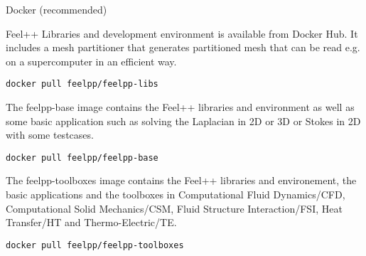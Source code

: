 \begin{frame}{Docker (recommended)}

    \begin{tcolorbox}[title=\texttt{feelpp/feelpp-libs},enhanced, watermark
      graphics=figures/feelpp/download-image-button.jpg, watermark
      overzoom=1.0, height=5cm,watermark opacity=0.25]


      Feel++ Libraries and development environment is available from
      Docker Hub. It includes a mesh partitioner that generates
      partitioned mesh that can be read e.g. on a supercomputer in an
      efficient way.\\[1cm]

      \centerline{\texttt{docker pull feelpp/feelpp-libs}}

    \end{tcolorbox}
    \framebreak
        \begin{tcolorbox}[title=\texttt{feelpp/feelpp-base},enhanced, watermark
      graphics=figures/feelpp/download-image-button.jpg, watermark
      overzoom=1.0, height=5cm,watermark opacity=0.25]


      The feelpp-base image contains the \alert{Feel++ libraries and
      environment} as well as some \alert{basic application} such as solving
      the Laplacian in 2D or 3D or Stokes in 2D with some testcases.\\[1cm]


      \centerline{\texttt{docker pull feelpp/feelpp-base}}

    \end{tcolorbox}

    \framebreak

        \begin{tcolorbox}[title=\texttt{feelpp/feelpp-toolboxes},enhanced, watermark
      graphics=figures/feelpp/download-image-button.jpg, watermark
      overzoom=1.0, height=5cm,watermark opacity=0.25]

      The feelpp-toolboxes image contains the \alert{Feel++ libraries and
      environement, the basic applications and the toolboxes} in
      Computational Fluid Dynamics/CFD, Computational Solid
      Mechanics/CSM, Fluid Structure Interaction/FSI, Heat Transfer/HT
      and Thermo-Electric/TE.\\[1cm]


      \centerline{\texttt{docker pull feelpp/feelpp-toolboxes}}

    \end{tcolorbox}

\end{frame}


